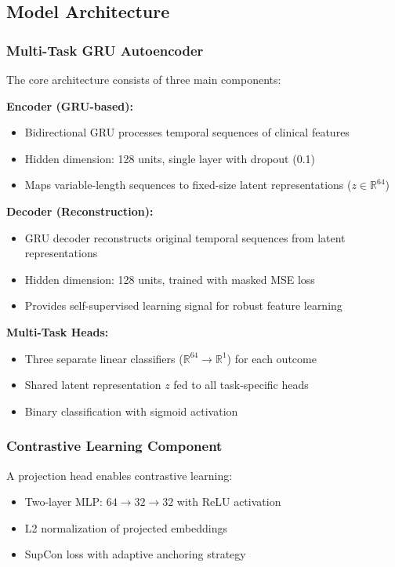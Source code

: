 \documentclass[11pt]{article}
\begin{document}
\subsection{Model Architecture}

\subsubsection{Multi-Task GRU Autoencoder}
The core architecture consists of three main components:

\textbf{Encoder (GRU-based):}
\begin{itemize}
    \item Bidirectional GRU processes temporal sequences of clinical features
    \item Hidden dimension: 128 units, single layer with dropout (0.1)
    \item Maps variable-length sequences to fixed-size latent representations ($z \in \mathbb{R}^{64}$)
\end{itemize}

\textbf{Decoder (Reconstruction):}
\begin{itemize}
    \item GRU decoder reconstructs original temporal sequences from latent representations
    \item Hidden dimension: 128 units, trained with masked MSE loss
    \item Provides self-supervised learning signal for robust feature learning
\end{itemize}

\textbf{Multi-Task Heads:}
\begin{itemize}
    \item Three separate linear classifiers ($\mathbb{R}^{64} \rightarrow \mathbb{R}^1$) for each outcome
    \item Shared latent representation $z$ fed to all task-specific heads
    \item Binary classification with sigmoid activation
\end{itemize}

\subsubsection{Contrastive Learning Component}
A projection head enables contrastive learning:
\begin{itemize}
    \item Two-layer MLP: $64 \rightarrow 32 \rightarrow 32$ with ReLU activation
    \item L2 normalization of projected embeddings
    \item SupCon loss with adaptive anchoring strategy
\end{itemize}
\end{document}
